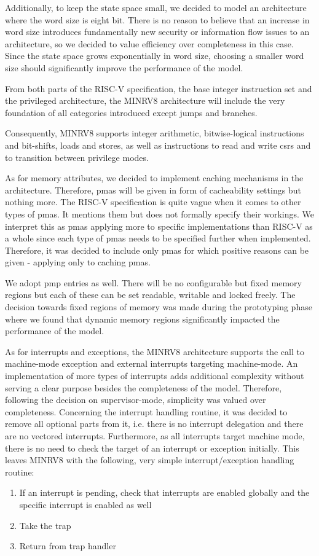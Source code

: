 Additionally, to keep the state space small, we decided to model an architecture where the word size is eight bit.
There is no reason to believe that an increase in word size introduces fundamentally new security or information flow issues to an architecture, so we decided to value efficiency over completeness in this case.
Since the state space grows exponentially in word size, choosing a smaller word size should significantly improve the performance of the model.

From both parts of the RISC-V specification, the base integer instruction set and the privileged architecture, the MINRV8 architecture will include the very foundation of all categories introduced except jumps and branches.

Consequently, MINRV8 supports integer arithmetic, bitwise-logical instructions and bit-shifts, loads and stores, as well as instructions to read and write \glspl{csr} and to transition between privilege modes.

As for memory attributes, we decided to implement caching mechanisms in the architecture.
Therefore, \glspl{pma} will be given in form of cacheability settings but nothing more.
The RISC-V specification is quite vague when it comes to other types of \glspl{pma}.
It mentions them but does not formally specify their workings.
We interpret this as \glspl{pma} applying more to specific implementations than RISC-V as a whole since each type of \glspl{pma} needs to be specified further when implemented.
Therefore, it was decided to include only \glspl{pma} for which positive reasons can be given - applying only to caching \glspl{pma}.

We adopt \gls{pmp} entries as well.
There will be no configurable but fixed memory regions but each of these can be set readable, writable and locked freely.
The decision towards fixed regions of memory was made during the prototyping phase where we found that dynamic memory regions significantly impacted the performance of the model.

As for interrupts and exceptions, the MINRV8 architecture supports the call to machine-mode exception and external interrupts targeting machine-mode.
An implementation of more types of interrupts adds additional complexity without serving a clear purpose besides the completeness of the model.
Therefore, following the decision on supervisor-mode, simplicity was valued over completeness.
Concerning the interrupt handling routine, it was decided to remove all optional parts from it, i.e. there is no interrupt delegation and there are no vectored interrupts.
Furthermore, as all interrupts target machine mode, there is no need to check the target of an interrupt or exception initially.
This leaves MINRV8 with the following, very simple interrupt/exception handling routine:
\begin{enumerate}
    \item If an interrupt is pending, check that interrupts are enabled globally and the specific interrupt is enabled as well
    \item Take the trap
    \item Return from trap handler
\end{enumerate}

